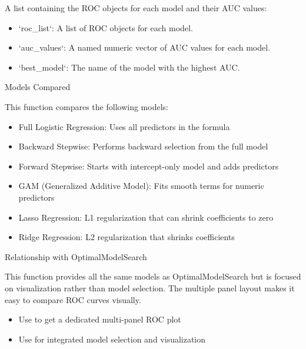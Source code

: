 \documentclass[a4paper]{book}
\begin{document}
%
\begin{Value}
A list containing the ROC objects for each model and their AUC values:
\begin{itemize}

\item{} `roc\_list`: A list of ROC objects for each model.
\item{} `auc\_values`: A named numeric vector of AUC values for each model.
\item{} `best\_model`: The name of the model with the highest AUC.

\end{itemize}

\end{Value}
%
\begin{Section}{Models Compared}

This function compares the following models:
\begin{itemize}

\item{} Full Logistic Regression: Uses all predictors in the formula
\item{} Backward Stepwise: Performs backward selection from the full model
\item{} Forward Stepwise: Starts with intercept-only model and adds predictors
\item{} GAM (Generalized Additive Model): Fits smooth terms for numeric predictors
\item{} Lasso Regression: L1 regularization that can shrink coefficients to zero
\item{} Ridge Regression: L2 regularization that shrinks coefficients

\end{itemize}

\end{Section}
%
\begin{Section}{Relationship with OptimalModelSearch}

This function provides all the same models as OptimalModelSearch but is focused on visualization 
rather than model selection. The multiple panel layout makes it easy to compare ROC curves visually.
\begin{itemize}

\item{} Use  to get a dedicated multi-panel ROC plot
\item{} Use  for integrated model selection and visualization

\end{itemize}

\end{Section}
\end{document}
